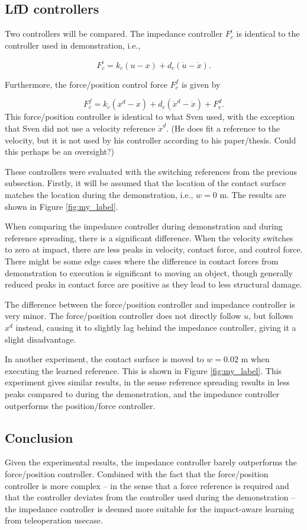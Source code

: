 \documentclass[11pt]{report}
\numberwithin{equation}{section}        %
\numberwithin{figure}{section}          %
\numberwithin{table}{section}           %
\begin{document}
  \subsection{LfD controllers}
  Two controllers will be compared. The impedance controller $F_c^i$ is identical to the controller used in demonstration, i.e.,

  $$ F_c^i = k_c(u-x)+d_c(\dot{u}-\dot{x}).$$

  Furthermore, the force/position control force $F_c^f$ is given by

  $$ F_c^f = k_c(x^d-x)+d_c(\dot{x}^d-\dot{x}) + F_e^d.$$  
  This force/position controller is identical to what Sven used, with the exception that Sven did not use a velocity reference $\dot{x}^d$. (He does fit a reference to the velocity, but it is not used by his controller according to his paper/thesis. Could this perhaps be an oversight?)

  These controllers were evaluated with the switching references from the previous subsection. Firstly, it will be assumed that the location of the contact surface matches the location during the demonstration, i.e., $w=0$ m. The results are shown in Figure \ref{fig:my_label}.

  When comparing the impedance controller during demonstration and during reference spreading, there is a significant difference. When the velocity switches to zero at impact, there are less peaks in velocity, contact force, and control force. There might be some edge cases where the difference in contact forces from demonstration to execution is significant to moving an object, though generally reduced peaks in contact force are positive as they lead to less structural damage.

  The difference between the force/position controller and impedance controller is very minor. The force/position controller does not directly follow $u$, but follows $x^d$ instead, causing it to slightly lag behind the impedance controller, giving it a slight disadvantage.

  In another experiment, the contact surface is moved to $w=0.02$ m when executing the learned reference. This is shown in Figure \ref{fig:my_label}. This experiment gives similar results, in the sense reference spreading results in less peaks compared to during the demonstration, and the impedance controller outperforms the position/force controller.

  \subsection{Conclusion}
  Given the experimental results, the impedance controller barely outperforms the force/position controller. Combined with the fact that the force/position controller is more complex -- in the sense that a force reference is required and that the controller deviates from the controller used during the demonstration -- the impedance controller is deemed more suitable for the impact-aware learning from teleoperation usecase.
\end{document}
